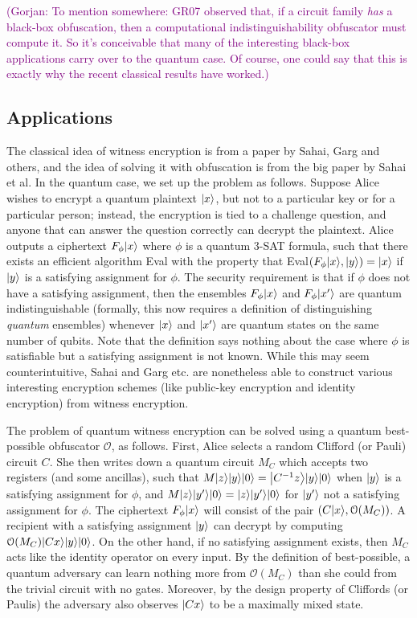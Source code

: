 \documentclass[11pt]{article}
\numberwithin{equation}{section}
\newcommand{\ga}[1]{{ \textcolor{purple}{(Gorjan:  #1)}}{}}
\begin{document}
\ga{To mention somewhere: GR07 observed that, if a circuit family \emph{has} a black-box obfuscation, then a computational indistinguishability obfuscator must compute it. So it's conceivable that many of the interesting black-box applications carry over to the quantum case. Of course, one could say that this is exactly why the recent classical results have worked.}


\subsection{Applications}

 The classical idea of witness encryption is from a paper by Sahai, Garg and others, and the idea of solving it with obfuscation is from the big paper by Sahai et al. In the quantum case, we set up the problem as follows. Suppose Alice wishes to encrypt a quantum plaintext ${\left\vert{x}\right\rangle}$, but not to a particular key or for a particular person; instead, the encryption is tied to a challenge question, and anyone that can answer the question correctly can decrypt the plaintext. Alice outputs a ciphertext $F_\phi {\left\vert{x}\right\rangle}$ where $\phi$ is a quantum 3-SAT formula, such that there exists an efficient algorithm Eval with the property that Eval$(F_\phi{\left\vert{x}\right\rangle}, {\left\vert{y}\right\rangle}) = {\left\vert{x}\right\rangle}$ if ${\left\vert{y}\right\rangle}$ is a satisfying assignment for $\phi$. The security requirement is that if $\phi$ does not have a satisfying assignment, then the ensembles $F_\phi {\left\vert{x}\right\rangle}$ and $F_\phi {\left\vert{x'}\right\rangle}$ are quantum indistinguishable (formally, this now requires a definition of distinguishing \emph{quantum} ensembles) whenever ${\left\vert{x}\right\rangle}$ and ${\left\vert{x'}\right\rangle}$ are quantum states on the same number of qubits. Note that the definition says nothing about the case where $\phi$ is satisfiable but a satisfying assignment is not known. While this may seem counterintuitive, Sahai and Garg etc. are nonetheless able to construct various interesting encryption schemes (like public-key encryption and identity encryption) from witness encryption. 

The problem of quantum witness encryption can be solved using a quantum best-possible obfuscator $\mathcal O$, as follows. First, Alice selects a random Clifford (or Pauli) circuit $C$. She then writes down a quantum circuit $M_C$ which accepts two registers (and some ancillas), such that $M {\left\vert{z}\right\rangle} {\left\vert{y}\right\rangle} {\left\vert{0}\right\rangle} = {\left\vert{C^{-1}z}\right\rangle} {\left\vert{y}\right\rangle} {\left\vert{0}\right\rangle}$ when ${\left\vert{y}\right\rangle}$ is a satisfying assignment for $\phi$, and $M {\left\vert{z}\right\rangle} {\left\vert{y'}\right\rangle} {\left\vert{0}\right\rangle} = {\left\vert{z}\right\rangle} {\left\vert{y'}\right\rangle} {\left\vert{0}\right\rangle}$ for ${\left\vert{y'}\right\rangle}$ not a satisfying assignment for $\phi$. The ciphertext $F_\phi {\left\vert{x}\right\rangle}$ will consist of the pair $(C {\left\vert{x}\right\rangle}, \mathcal O(M_C))$. A recipient with a satisfying assignment ${\left\vert{y}\right\rangle}$ can decrypt by computing $\mathcal O(M_C) {\left\vert{Cx}\right\rangle} {\left\vert{y}\right\rangle} {\left\vert{0}\right\rangle}$. On the other hand, if no satisfying assignment exists, then $M_C$ acts like the identity operator on every input. By the definition of best-possible, a quantum adversary can learn nothing more from $\mathcal O(M_C)$ than she could from the trivial circuit with no gates. Moreover, by the design property of Cliffords (or Paulis) the adversary also observes ${\left\vert{Cx}\right\rangle}$ to be a maximally mixed state.
\end{document}
